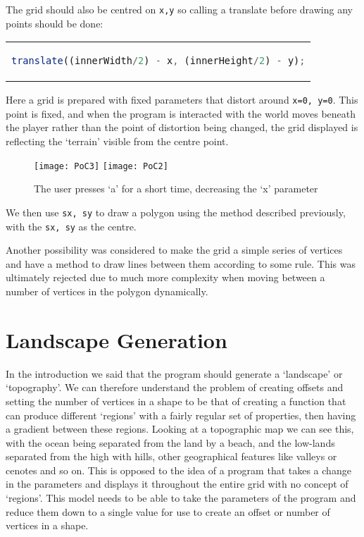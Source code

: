 The grid should also be centred on \verb|x,y| so calling a translate before
drawing any points should be done:
\begin{center}
\begin{tabular}{c}
\begin{lstlisting}[language=JavaScript]
translate((innerWidth/2) - x, (innerHeight/2) - y);
\end{lstlisting}
\end{tabular}
\end{center}

Here a grid is prepared with fixed parameters that distort around
\verb|x=0, y=0|. This point is fixed, and when the program is interacted with
the world moves beneath the player rather than the point of distortion being
changed, the grid displayed is reflecting the `terrain' visible from the centre
point.

\begin{figure}[H]
\centering
\texttt{[image: PoC3]}
\hspace*{0.5cm}
\texttt{[image: PoC2]}
\caption{The user presses `a' for a short time, decreasing the `x' parameter}
\label{demomovement}
\end{figure}

We then use \verb|sx, sy| to draw a polygon using the method described
previously, with the \verb|sx, sy| as the centre.

Another possibility was considered to make the grid a simple series of vertices
and have a method to draw lines between them according to some rule. This was
ultimately rejected due to much more complexity when moving between a number of
vertices in the polygon dynamically.

\section{Landscape Generation}
\label{landgen}
In the introduction we said that the program should generate a `landscape' or
`topography'. We can therefore understand the problem of creating offsets and
setting the number of vertices in a shape to be that of creating a function that
can produce different `regions' with a fairly regular set of properties, then
having a gradient between these regions. Looking at a topographic map we can see
this, with the ocean being separated from the land by a beach, and the low-lands
separated from the high with hills, other geographical features like valleys or
cenotes and so on. This is opposed to the idea of a program that takes a change
in the parameters and displays it throughout the entire grid with no concept of
`regions'. This model needs to be able to take the parameters of the program and
reduce them down to a single value for use to create an offset or number of
vertices in a shape.

